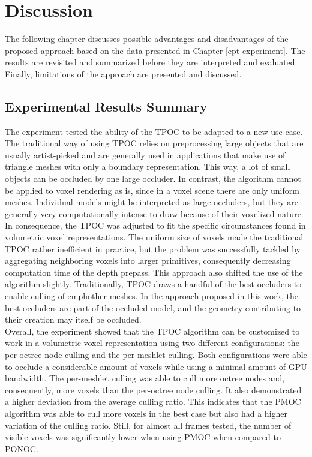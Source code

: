 \chapter{Discussion} \label{cpt-discussion}

The following chapter discusses possible advantages and disadvantages of the proposed approach based on 
the data presented in Chapter \ref{cpt-experiment}. The results are revisited and summarized before they 
are interpreted and evaluated. Finally, limitations of the approach are presented and discussed.

\section{Experimental Results Summary}

The experiment tested the ability of the \ac{TPOC} to be adapted to a new use case. The traditional way of 
using \ac{TPOC} relies on preprocessing large objects that are usually artist-picked and are generally used 
in applications that make use of triangle meshes with only a boundary representation. This way, a lot of 
small objects can be occluded by one large occluder. In contrast, the algorithm cannot be applied to voxel 
rendering as is, since in a voxel scene there are only uniform meshes. Individual models might be interpreted 
as large occluders, but they are generally very computationally intense to draw because of their voxelized 
nature. \\

\noindent
In consequence, the \ac{TPOC} was adjusted to fit the specific circumstances found in volumetric voxel representations. 
The uniform size of voxels made the traditional \ac{TPOC} rather inefficient in practice, but the problem was 
successfully tackled by aggregating neighboring voxels into larger primitives, consequently decreasing computation 
time of the depth prepass. This approach also shifted the use of the algorithm slightly. Traditionally, \ac{TPOC} 
draws a handful of the best occluders to enable culling of emph{other} meshes. In the approach proposed in this work, 
the best occluders are part of the occluded model, and the geometry contributing to their creation may itself be 
occluded. \\

\noindent
Overall, the experiment showed that the \ac{TPOC} algorithm can be customized to work in a volumetric voxel 
representation using two different configurations: the per-octree node culling and the per-meshlet culling. 
Both configurations were able to occlude a considerable amount of voxels while using a minimal amount of 
\ac{GPU} bandwidth. The per-meshlet culling was able to cull more octree nodes and, consequently, more 
voxels than the per-octree node culling. It also demonstrated a higher deviation from the average culling 
ratio. This indicates that the \ac{PMOC} algorithm was able to cull more voxels in the best case but also 
had a higher variation of the culling ratio. Still, for almost all frames tested, the number of visible 
voxels was significantly lower when using \ac{PMOC} when compared to \ac{PONOC}.\\

